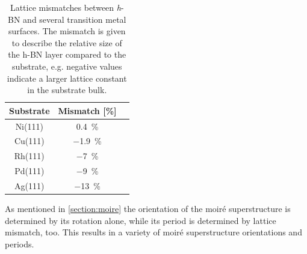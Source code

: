 \begin{table}\centering
\caption{Lattice mismatches between \textit{h}-BN and several transition metal surfaces. The mismatch is given to describe the relative size of the h-BN layer compared to the substrate, e.g. negative values indicate a larger lattice constant in the substrate bulk.}

	\begin{tabular}{ccc}
	Substrate 	& Mismatch [\%] \\ \hline
	Ni(111)		& \SI{+0.4}{\percent} \\
	Cu(111)		& \SI{-1.9}{\percent} \\	
	Rh(111)		& \SI{-7}{\percent} \\	
	Pd(111)		& \SI{-9}{\percent} \\
	Ag(111)		& \SI{-13}{\percent} \\

\end{tabular}
\label{tab:h-BN-mismatch}
\end{table}

As mentioned in \ref{section:moire} the orientation of the moir\'e superstructure is determined by its rotation alone, while its period is determined by lattice mismatch, too. This results in a variety of moir\'e superstructure orientations and periods.

